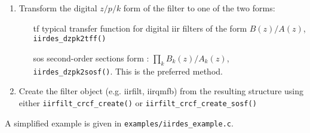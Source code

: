 \begin{enumerate}
\item Transform the digital $z/p/k$ form of the filter to one of the two forms:
    \begin{itemize}
    \item[tf]  typical transfer function for digital iir filters of the form
        $B(z)/A(z)$, {\tt iirdes\_dzpk2tff()}
    \item[sos] second-order sections form : $\prod_k{ B_k(z)/A_k(z) }$, 
        {\tt iirdes\_dzpk2sosf()}.
        This is the preferred method.
    \end{itemize}

\item Create the filter object (e.g. iirfilt, iirqmfb) from the resulting
      structure using either {\tt iirfilt\_crcf\_create()} or
      {\tt iirfilt\_crcf\_create\_sosf()}

\end{enumerate}

A simplified example is given in {\tt examples/iirdes\_example.c}.

